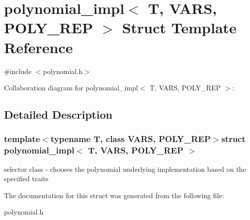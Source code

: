 \hypertarget{structpolynomial__impl}{\section{polynomial\-\_\-impl$<$ T, V\-A\-R\-S, P\-O\-L\-Y\-\_\-\-R\-E\-P $>$ Struct Template Reference}
\label{structpolynomial__impl}
}


{\ttfamily \#include $<$polynomial.\-h$>$}



Collaboration diagram for polynomial\-\_\-impl$<$ T, V\-A\-R\-S, P\-O\-L\-Y\-\_\-\-R\-E\-P $>$\-:


\subsection{Detailed Description}
\subsubsection*{template$<$typename T, class V\-A\-R\-S, P\-O\-L\-Y\-\_\-\-R\-E\-P$>$struct polynomial\-\_\-impl$<$ T, V\-A\-R\-S, P\-O\-L\-Y\-\_\-\-R\-E\-P $>$}

selector class -\/ chooses the polynomial underlying implementation based on the specified traits 

The documentation for this struct was generated from the following file\-:\begin{DoxyCompactItemize}
\item 
polynomial.\-h\end{DoxyCompactItemize}
